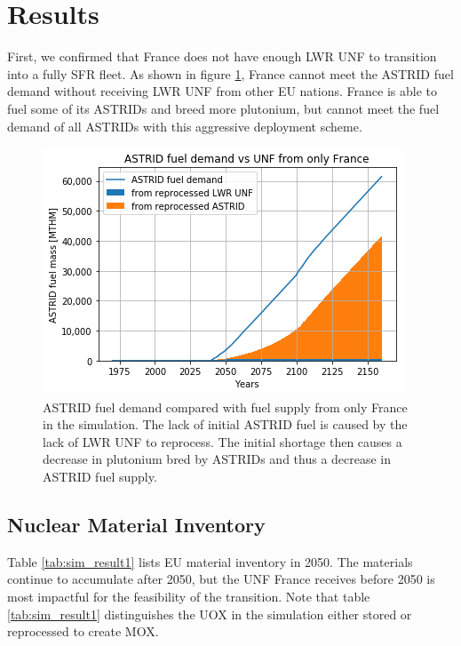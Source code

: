\section{Results}

First, we confirmed that France does not have enough
\gls{LWR} \gls{UNF} to transition into a fully \gls{SFR}
fleet. As shown in figure \ref{fig:only_france}, France
cannot meet the \gls{ASTRID} fuel demand without receiving
\gls{LWR} \gls{UNF} from other \gls{EU} nations. France
is able to fuel some of its \glspl{ASTRID} and breed more
plutonium, but cannot meet the fuel demand of 
all \glspl{ASTRID} with this aggressive deployment scheme.


\begin{figure}[htbp!]
	\begin{center}
		\includegraphics[scale=0.7]{./images/french-transition/france_only_compare.png}
	\end{center}
	\caption{\gls{ASTRID} fuel demand compared with fuel supply from only
			 France in the simulation. The lack of initial \gls{ASTRID} fuel
			 is caused by the lack of \gls{LWR} \gls{UNF} to reprocess. The
			 initial shortage then causes a decrease in plutonium bred by
			 \glspl{ASTRID} and thus a decrease in \gls{ASTRID} fuel supply.}
	\label{fig:only_france}
\end{figure}


\subsection{Nuclear Material Inventory}

Table \ref{tab:sim_result1} 
lists \gls{EU} material inventory in 2050.
The materials continue to accumulate after 2050, but the
\gls{UNF} France receives before 2050 is most impactful for the
feasibility of the transition. Note that table \ref{tab:sim_result1} 
distinguishes the
\gls{UOX} in the simulation either stored or reprocessed to create \gls{MOX}.


